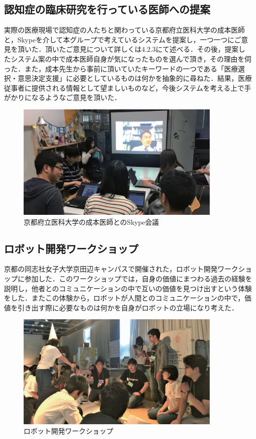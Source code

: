\documentclass[../report]{subfiles}
\begin{document}
\subsection{認知症の臨床研究を行っている医師への提案}
実際の医療現場で認知症の人たちと関わっている京都府立医科大学の成本医師と，Skypeを介して本グループで考えているシステムを提案し，一つ一つにご意見を頂いた．頂いたご意見について詳しくは4.2.3にて述べる．その後，提案したシステム案の中で成本医師自身が気になったものを選んで頂き，その理由を伺った．また，成本先生から事前に頂いていたキーワードの一つである「医療選択・意思決定支援」に必要としているものは何かを抽象的に尋ねた．結果，医療従事者に提供される情報として望ましいものなど，今後システムを考える上で手がかりになるようなご意見を頂いた．
\begin{figure}[htbp]
    \begin{center}
        \includegraphics[width=10cm]{imgs/ninchisyo-kaigi.png}
        \caption{京都府立医科大学の成本医師とのSkype会議}
        \label{fig:ninchisyo-kaigi}
    \end{center}
\end{figure}

\subsection{ロボット開発ワークショップ}
京都の同志社女子大学京田辺キャンパスで開催された，ロボット開発ワークショップに参加した．このワークショップでは，自身の価値にまつわる過去の経験を説明し，他者とのコミュニケーションの中で互いの価値を見つけ出すという体験をした．またこの体験から，ロボットが人間とのコミュニケーションの中で，価値を引き出す際に必要なものは何かを自身がロボットの立場になり考えた．
\begin{figure}[htbp]
    \begin{center}
        \includegraphics[width=10cm]{imgs/ninchisyo-ws.png}
        \caption{ロボット開発ワークショップ}
        \label{fig:ninchisyo-ws}
    \end{center}
\end{figure}
\end{document}
